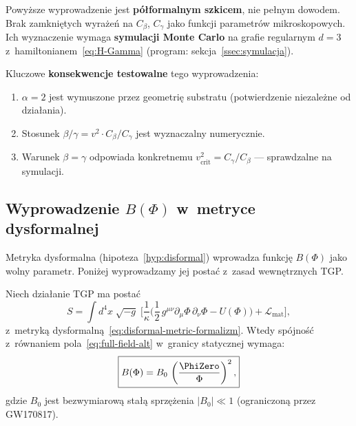 \begin{remark}\label{rem:continuum-status}
Powy\.zsze wyprowadzenie jest \textbf{p\'o\l{}formalnym szkicem},
nie pe\l{}nym dowodem. Brak zamkni\k{e}tych wyra\.ze\'n
na $C_\beta$, $C_\gamma$ jako funkcji parametr\'ow mikro\-skopowych.
Ich wyznaczenie wymaga \textbf{symulacji Monte Carlo}
na grafie regularnym $d = 3$ z~hamiltonianem~\eqref{eq:H-Gamma}
(program: sekcja~\ref{ssec:symulacja}).

Kluczowe \textbf{konsekwencje testowalne} tego wyprowadzenia:
\begin{enumerate}[nosep]
  \item $\alpha = 2$ jest wymuszone przez geometri\k{e} substratu
    (potwierdzenie niezale\.zne od dzia\l{}ania).
  \item Stosunek $\beta/\gamma = v^2 \cdot C_\beta/C_\gamma$
    jest wyznaczalny numerycznie.
  \item Warunek $\beta = \gamma$ odpowiada konkretnemu
    $v_{\mathrm{crit}}^2 = C_\gamma/C_\beta$ ---
    sprawdzalne na symulacji.
\end{enumerate}
\end{remark}

\subsection{Wyprowadzenie $B(\Phi)$ w~metryce dysformalnej}\label{ssec:B-derivation}

Metryka dysformalna (hipoteza~\ref{hyp:disformal}) wprowadza
funkcj\k{e} $B(\Phi)$ jako wolny parametr. Poni\.zej wyprowadzamy
jej posta\'c z~zasad wewn\k{e}trznych TGP.

\begin{proposition}\label{prop:B-from-action}
Niech dzia\l{}anie TGP ma posta\'c
\begin{equation}\label{eq:action-disformal}
  S = \int d^4x\;\sqrt{-g}\;\biggl[
    \frac{1}{\kappa}\biggl(
      \frac{1}{2}\,g^{\mu\nu}\partial_\mu\Phi\,\partial_\nu\Phi
      - U(\Phi)
    \biggr) + \mathcal{L}_{\mathrm{mat}}
  \biggr],
\end{equation}
z~metryk\k{a} dysformaln\k{a}~\eqref{eq:disformal-metric-formalizm}.
Wtedy sp\'ojno\'s\'c z~r\'ownaniem pola~\eqref{eq:full-field-alt}
w~granicy statycznej wymaga:
\begin{equation}\label{eq:B-form}
  \boxed{
    B(\Phi) = B_0\,\left(\frac{\PhiZero}{\Phi}\right)^2,
  }
\end{equation}
gdzie $B_0$ jest bezwymiarow\k{a} sta\l{}\k{a} sprz\k{e}\.zenia
$|B_0| \ll 1$ (ograniczon\k{a} przez GW170817).
\end{proposition}

